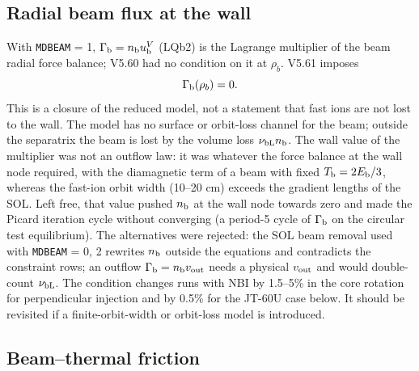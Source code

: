 \documentclass[11pt]{article}
\def\r#1{{\rm#1}}
\def\nb{n_\r{b}}
\def\uV#1{u_\r{#1}^V}
\def\Eb{E_\r{b}}
\def\nubL{\nu_\r{bL}}
\begin{document}
\subsection{Radial beam flux at the wall}
\label{sec:beamwall}

With \texttt{MDBEAM} = 1, $\Gamma_\r{b} = \nb\uV{b}$ (LQb2) is the Lagrange multiplier of
the beam radial force balance; V5.60 had no condition on it at $\rho_b$.  V5.61
imposes
\begin{equation}
  \Gamma_\r{b}(\rho_b) = 0 .
\end{equation}
This is a closure of the reduced model, not a statement that fast ions are not
lost to the wall.  The model has no surface or orbit-loss channel for the beam;
outside the separatrix the beam is lost by the volume loss $\nubL\nb$.  The wall
value of the multiplier was not an outflow law: it was whatever the force balance
at the wall node required, with the diamagnetic term of a beam with fixed
$T_\r{b} = 2\Eb/3$, whereas the fast-ion orbit width (10--20 cm) exceeds the gradient
lengths of the SOL.  Left free, that value pushed $\nb$ at the wall node towards zero
and made the Picard iteration cycle without converging (a period-5 cycle of
$\Gamma_\r{b}$ on the circular test equilibrium).  The alternatives were rejected: the
SOL beam removal used with \texttt{MDBEAM} = 0, 2 rewrites $\nb$ outside the equations
and contradicts the constraint rows; an outflow $\Gamma_\r{b} = \nb v_\r{out}$ needs a
physical $v_\r{out}$ and would double-count $\nubL$.  The condition changes runs with
NBI by 1.5--5\% in the core rotation for perpendicular injection and by 0.5\% for the
JT-60U case below.  It should be revisited if a finite-orbit-width or orbit-loss
model is introduced.

\subsection{Beam--thermal friction}
\label{sec:v561friction}
\end{document}
